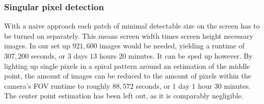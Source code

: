 \documentclass[journal,final,a4paper,twoside]{PS}
\begin{document}
\subsubsection{Singular pixel detection}
\label{singlePixel}
With a naive approach each patch of minimal detectable size on the screen has to be turned on separately. This means screen width times screen height necessary images. In our set up $921,600$ images would be needed, yielding a runtime of $307,200$ seconds, or $3$ days $13$ hours $20$ minutes.
It can be sped up however. By lighting up single pixels in a spiral pattern around an estimation of the middle point, the amount of images can be reduced to the amount of pixels within the camera’s FOV runtime to roughly $88,572$ seconds, or $1$ day $1$ hour $30$ minutes.
The center point estimation has been left out, as it is comparably negligible.\\
	
\end{document}
